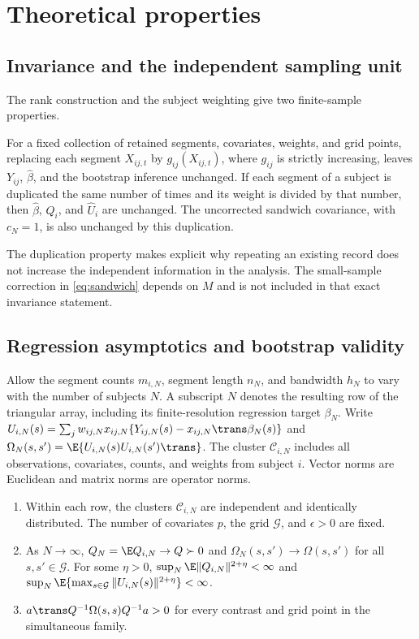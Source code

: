 \section{Theoretical properties}\label{sec:theory}
\subsection{Invariance and the independent sampling unit}
The rank construction and the subject weighting give two finite-sample properties.

\begin{proposition}\label{prop:invariance}
For a fixed collection of retained segments, covariates, weights, and grid points, replacing each segment $X_{ij,t}$ by $g_{ij}(X_{ij,t})$, where $g_{ij}$ is strictly increasing, leaves $Y_{ij}$, $\widehat\beta$, and the bootstrap inference unchanged. If each segment of a subject is duplicated the same number of times and its weight is divided by that number, then $\widehat\beta$, $Q_i$, and $\widehat U_i$ are unchanged. The uncorrected sandwich covariance, with $c_N=1$, is also unchanged by this duplication.
\end{proposition}

The duplication property makes explicit why repeating an existing record does not increase the independent information in the analysis. The small-sample correction in \eqref{eq:sandwich} depends on $M$ and is not included in that exact invariance statement.

\subsection{Regression asymptotics and bootstrap validity}
Allow the segment counts $m_{i,N}$, segment length $n_N$, and bandwidth $h_N$ to vary with the number of subjects $N$. A subscript $N$ denotes the resulting row of the triangular array, including its finite-resolution regression target $\beta_N$. Write $U_{i,N}(s)=\sum_jw_{ij,N}x_{ij,N}\{Y_{ij,N}(s)-x_{ij,N}\trans\beta_N(s)\}$ and $\Omega_N(s,s')=\E\{U_{i,N}(s)U_{i,N}(s')\trans\}$. The cluster $\mathcal C_{i,N}$ includes all observations, covariates, counts, and weights from subject $i$. Vector norms are Euclidean and matrix norms are operator norms.

\begin{enumerate}
\item[(A1)] Within each row, the clusters $\mathcal C_{i,N}$ are independent and identically distributed. The number of covariates $p$, the grid $\mathcal G$, and $\epsilon>0$ are fixed.
\item[(A2)] As $N\to\infty$, $Q_N=\E Q_{i,N}\to Q\succ0$ and $\Omega_N(s,s')\to\Omega(s,s')$ for all $s,s'\in\mathcal G$. For some $\eta>0$, $\sup_N\E\|Q_{i,N}\|^{2+\eta}<\infty$ and $\sup_N\E\{\max_{s\in\mathcal G}\|U_{i,N}(s)\|^{2+\eta}\}<\infty$.
\item[(A3)] $a\trans Q^{-1}\Omega(s,s)Q^{-1}a>0$ for every contrast and grid point in the simultaneous family.
\end{enumerate}

